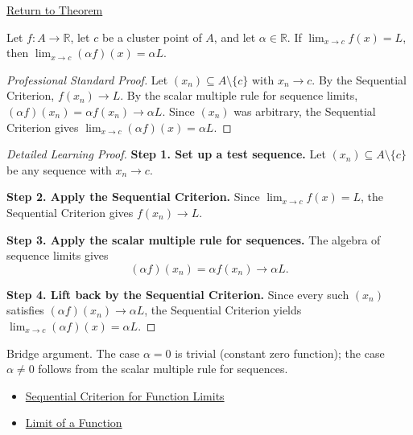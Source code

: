 \newpage
{}
\label{prf:limit-scalar-multiple}

\begin{remark*}[Return]
\hyperref[thm:limit-scalar-multiple]{Return to Theorem}
\end{remark*}

\begin{theorem*}
Let $f : A \to \mathbb{R}$, let $c$ be a cluster point of $A$, and let
$\alpha \in \mathbb{R}$. If $\lim_{x\to c}f(x)=L$, then
$\lim_{x\to c}(\alpha f)(x) = \alpha L$.
\end{theorem*}

\begin{proof}[Professional Standard Proof]
\LRAProofBodyStart
Let $(x_n) \subseteq A \setminus \{c\}$ with $x_n \to c$.
By the Sequential Criterion, $f(x_n) \to L$.
By the scalar multiple rule for sequence limits, $(\alpha f)(x_n) = \alpha f(x_n) \to \alpha L$.
Since $(x_n)$ was arbitrary, the Sequential Criterion gives
$\lim_{x\to c}(\alpha f)(x) = \alpha L$.
\end{proof}

\begin{proof}[Detailed Learning Proof]
\LRAProofBodyStart
\textbf{Step 1. Set up a test sequence.}
Let $(x_n) \subseteq A \setminus \{c\}$ be any sequence with $x_n \to c$.

\textbf{Step 2. Apply the Sequential Criterion.}
Since $\lim_{x\to c}f(x)=L$, the Sequential Criterion gives $f(x_n) \to L$.

\textbf{Step 3. Apply the scalar multiple rule for sequences.}
The algebra of sequence limits gives
\[
  (\alpha f)(x_n) = \alpha f(x_n) \to \alpha L.
\]

\textbf{Step 4. Lift back by the Sequential Criterion.}
Since every such $(x_n)$ satisfies $(\alpha f)(x_n) \to \alpha L$, the
Sequential Criterion yields $\lim_{x\to c}(\alpha f)(x) = \alpha L$.
\end{proof}

\begin{remark*}
Bridge argument. The case $\alpha = 0$ is trivial (constant zero function);
the case $\alpha \neq 0$ follows from the scalar multiple rule for sequences.
\end{remark*}

\begin{dependencies}
\begin{itemize}
  \item \hyperref[prop:sequential-criterion-limits]{Sequential Criterion for Function Limits}
  \item \hyperref[def:limit-function]{Limit of a Function}
\end{itemize}
\end{dependencies}

\clearpage
